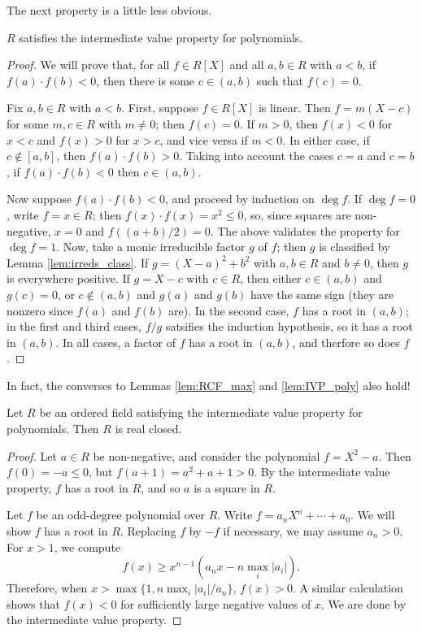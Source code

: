 The next property is a little less obvious.

\begin{lemma}
  \label{lem:IVP_poly}
  $R$ satisfies the intermediate value property for polynomials.
\end{lemma}
\begin{proof}
  We will prove that, for all $f\in R[X]$ and all $a,b\in R$ with $a<b$, if $f(a)\cdot f(b)<0$, then there is some $c\in(a,b)$ such that $f(c)=0$.

  Fix $a,b\in R$ with $a<b$. First, suppose $f\in R[X]$ is linear. Then $f=m(X-c)$ for some $m,c\in R$ with $m\neq0$; then $f(c)=0$. If $m>0$, then $f(x)<0$ for $x<c$ and $f(x)>0$ for $x>c$, and vice versa if $m<0$. In either case, if $c\notin[a,b]$, then $f(a)\cdot f(b)>0$. Taking into account the cases $c=a$ and $c=b$, if $f(a)\cdot f(b)<0$ then $c\in(a,b)$.

  Now suppose $f(a)\cdot f(b)<0$, and proceed by induction on $\deg f$. If $\deg f=0$, write $f=x\in R$; then $f(x)\cdot f(x)=x^2\leq 0$, so, since squares are non-negative, $x=0$ and $f((a+b)/2)=0$. The above validates the property for $\deg f=1$. Now, take a monic irreducible factor $g$ of $f$; then $g$ is classified by Lemma \ref{lem:irreds_class}. If $g=(X-a)^2+b^2$ with $a,b\in R$ and $b\neq0$, then $g$ is everywhere positive. If $g=X-c$ with $c\in R$, then either $c\in(a,b)$ and $g(c)=0$, or $c\notin(a,b)$ and $g(a)$ and $g(b)$ have the same sign (they are nonzero since $f(a)$ and $f(b)$ are). In the second case, $f$ has a root in $(a,b)$; in the first and third cases, $f/g$ satsifies the induction hypothesis, so it has a root in $(a,b)$. In all cases, a factor of $f$ has a root in $(a,b)$, and therfore so does $f$.
\end{proof}

In fact, the converses to Lemmas \ref{lem:RCF_max} and \ref{lem:IVP_poly} also hold!

\begin{theorem}
  \label{thm:IVP_poly_imp_RCF}
  Let $R$ be an ordered field satisfying the intermediate value property for polynomials. Then $R$ is real closed.
\end{theorem}
\begin{proof}
  Let $a\in R$ be non-negative, and consider the polynomial $f=X^2-a$. Then $f(0)=-a\leq0$, but $f(a+1)=a^2+a+1>0$. By the intermediate value property, $f$ has a root in $R$, and so $a$ is a square in $R$.

  Let $f$ be an odd-degree polynomial over $R$. Write $f=a_nX^n+\cdots+a_0$. We will show $f$ has a root in $R$. Replacing $f$ by $-f$ if necessary, we may assume $a_n>0$. For $x>1$, we compute
  \[f(x)\geq x^{n-1}(a_nx-n\max_i|a_i|).\]
  Therefore, when $x>\max\{1,n\max_i|a_i|/a_n\}$, $f(x)>0$. A similar calculation shows that $f(x)<0$ for sufficiently large negative values of $x$. We are done by the intermediate value property.
\end{proof}

